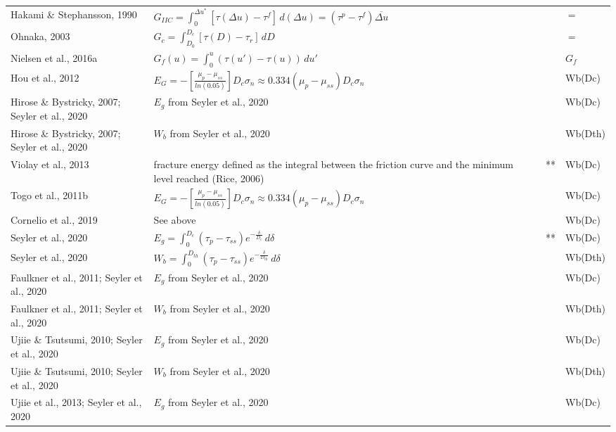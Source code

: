 \documentclass[12pt]{article}
\begin{document}
\begin{longtable}{|p{3.5 cm}|p{6.5 cm}|p{1.25 cm}|p{1.25 cm}|p{1.5 cm}|}
Hakami \& Stephansson, 1990 & \( \displaystyle G_{IIC} = \int_{0}^{\Delta u^*} [\tau(\Delta u) - \tau^f] \,d(\Delta u) = (\tau^p - \tau^f) \overline{\Delta u} \) & & & $=$ \\
Ohnaka, 2003 & \( \displaystyle G_c = \int_{D_0}^{D_c} [\tau(D)-\tau_r] \,dD \) & & & $=$ \\
Nielsen et al., 2016a & \( \displaystyle G_f(u) = \int_{0}^{u} (\tau(u') - \tau(u)) \,du' \) & & & $G_f$ \\
Hou et al., 2012 & \( \displaystyle E_G = - \left [ \frac{\mu_p - \mu_{ss}}{ln(0.05)} \right ] D_c \sigma_n \approx 0.334 (\mu_p - \mu_{ss}) D_c \sigma_n \) & & & Wb(Dc) \\
Hirose \& Bystricky, 2007; Seyler et al., 2020 & \( \displaystyle E_g \) from Seyler et al., 2020 & & & Wb(Dc) \\
Hirose \& Bystricky, 2007; Seyler et al., 2020 & \( \displaystyle W_b\) from Seyler et al., 2020 & & & Wb(Dth) \\
Violay et al., 2013 & fracture energy defined as the integral between the friction curve and the minimum level reached (Rice, 2006) & & ** & Wb(Dc) \\
Togo et al., 2011b & \( \displaystyle E_G = - \left [ \frac{\mu_p - \mu_{ss}}{ln(0.05)} \right ] D_c \sigma_n \approx 0.334 (\mu_p - \mu_{ss}) D_c \sigma_n \) & & & Wb(Dc) \\
Cornelio et al., 2019 & See above & & & Wb(Dc) \\
Seyler et al., 2020 & \( \displaystyle E_g = \int_{0}^{D_c} (\tau_p - \tau_{ss}) e^{-\frac{\delta}{D_c}} \,d\delta \) & & ** & Wb(Dc) \\
Seyler et al., 2020 & \( \displaystyle W_b = \int_{0}^{D_{th}} (\tau_p - \tau_{ss}) e^{-\frac{\delta}{D_{th}}} \,d\delta \) & & & Wb(Dth) \\
Faulkner et al., 2011; Seyler et al., 2020 & \( \displaystyle E_g \) from Seyler et al., 2020 & & & Wb(Dc) \\
Faulkner et al., 2011; Seyler et al., 2020 & \( \displaystyle W_b \) from Seyler et al., 2020 & & & Wb(Dth) \\
Ujiie \& Tsutsumi, 2010; Seyler et al., 2020 & \( \displaystyle E_g \) from Seyler et al., 2020 & & & Wb(Dc) \\
Ujiie \& Tsutsumi, 2010; Seyler et al., 2020 & \( \displaystyle W_b \) from Seyler et al., 2020 & & & Wb(Dth) \\
Ujiie et al., 2013; Seyler et al., 2020 & \( \displaystyle E_g \) from Seyler et al., 2020 & & & Wb(Dc) \\

\end{longtable}
\end{document}
